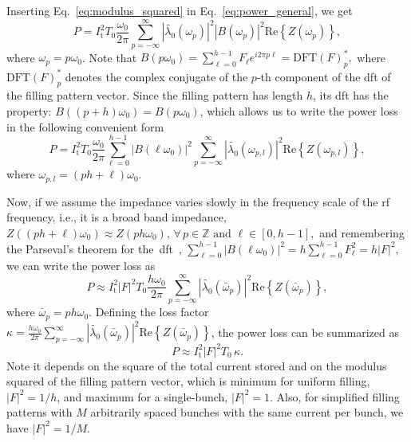\documentclass
[
    a4paper,
    biblatex,     %
]{jacow}
\providecommand{\Real}[1]{\ensuremath{\mathrm{Re}\left\{#1\right\}}}
\begin{document}
    Inserting Eq.~\eqref{eq:modulus_squared} in Eq.~\eqref{eq:power_general}, we get
    \begin{equation}
        P = I_\mathrm{t}^2T_0 \frac{\omega_0}{2\pi}\sum_{p=-\infty}^{\infty} \left|\tilde{\lambda_0}(\omega_p)\right|^2 \left|B(\omega_p)\right|^2\Real{Z(\omega_p)},
    \end{equation}
    where $\omega_p = p\omega_0$. Note that
    $
        B(p\omega_0) = \sum_{\ell=0}^{h-1}F_\ell e^{i2\pi p\ell} = \mathrm{DFT}(F)^*_p,
    $
    where $\mathrm{DFT}(F)^*_p$ denotes the complex conjugate of the $p$-th component of the \gls{dft} of the filling pattern vector. Since the filling pattern has length $h$, its \gls{dft} has the property:
    $
        B((p+h)\omega_0) = B(p\omega_0)
    $,
    which allows us to write the power loss in the following convenient form
    \begin{equation}
        P = I_\mathrm{t}^2T_0 \frac{\omega_0}{2\pi}\sum_{\ell=0}^{h-1} \left|B(\ell\omega_0)\right|^2\sum_{p=-\infty}^{\infty} \left|\tilde{\lambda_0}(\omega_{p,l})\right|^2 \Real{Z(\omega_{p,l})},
    \end{equation}
    where $\omega_{p,l} = (ph+\ell)\omega_0$.
    
    Now, if we assume the impedance varies slowly in the frequency scale of the rf frequency, i.e., it is a broad band impedance,
    $
        Z((ph+\ell)\omega_0) \approx Z(ph\omega_0), \, \forall\, p \in\mathbb{Z}\,\,\mathrm{and}\,\, \ell \in[0,h-1],
    $
    and remembering the Parseval's theorem for the~\gls{dft}~\cite{Wikipedia_DFT},
    $
        \sum_{\ell=0}^{h-1} \left|B(\ell\omega_0)\right|^2 = h\sum_{\ell=0}^{h-1} F_\ell^2 = h|F|^2,
    $
    we can write the power loss as
    \begin{equation}
        P \approx I_\mathrm{t}^2 \left|F\right|^2 T_0 \frac{h\omega_0}{2\pi}\sum_{p=-\infty}^{\infty} \left|\tilde{\lambda_0}(\bar{\omega}_p)\right|^2 \Real{Z(\bar{\omega}_p)},
    \end{equation}
    where $\bar{\omega}_p = ph\omega_0$. Defining the loss factor
    $
        \kappa = \frac{h\omega_0}{2\pi}\sum_{p=-\infty}^{\infty} \left|\tilde{\lambda_0}(\bar{\omega}_p)\right|^2 \Real{Z(\bar{\omega}_p)}
    $,
    the power loss can be summarized as
    \begin{equation}\label{eq:power_broadband}
        P \approx I_\mathrm{t}^2 \left|F\right|^2 T_0\, \kappa.
    \end{equation}
    Note it depends on the square of the total current stored and on the modulus squared of the filling pattern vector, which is minimum for uniform filling, $|F|^2=1/h$, and maximum for a single-bunch, $|F|^2=1$. Also, for simplified filling patterns with $M$ arbitrarily spaced bunches with the same current per bunch, we have $|F|^2=1/M$.
\end{document}
